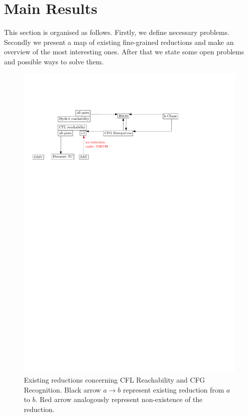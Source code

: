 \documentclass[acmsmall,review,nonacm]{acmart}\settopmatter{printfolios=true,printccs=false,printacmref=false}
\begin{document}
	
	\section{Main Results}
	
	This section is organised as follows. Firstly, we define necessary problems. Secondly we present a map of existing fine-grained reductions and make an overview of the most interesting ones. After that we state some open problems and possible ways to solve them. 
	
	\begin{figure}[!htp]
		
		\begin{center}  
			\includegraphics[scale = 0.8]{map_popl.pdf}
		\end{center}
	
		\caption{Existing reductions concerning CFL Reachability and CFG Recognition. Black arrow $a \rightarrow b$ represent existing reduction from $a$ to $b$. Red arrow analogously represent non-existence of the reduction. }
		
	\end{figure}
	
\end{document}
